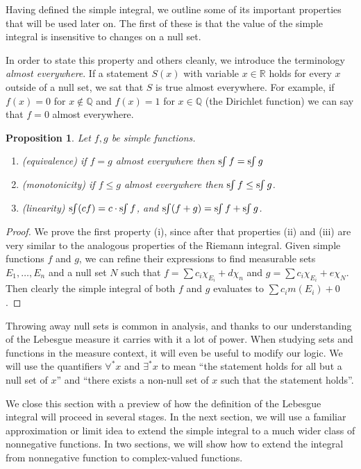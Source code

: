 \documentclass[11pt,oneside]{amsbook}
\newcommand{\QQ}{{\mathbb Q}}
\newcommand{\RR}{{\mathbb R}}
\newcommand{\sint}{\text{s}\kern-3pt\int}
\theoremstyle{definition}
\theoremstyle{plain}
\newtheorem{prop}[thm]{Proposition}
\theoremstyle{definition}
\theoremstyle{remark}
\numberwithin{equation}{section}
\numberwithin{figure}{section}
\begin{document}
Having defined the simple integral, we outline some of its important properties that will be used later on. The first of these is that the value of the simple integral is insensitive to changes on a null set.

In order to state this property and others cleanly, we introduce the terminology \emph{almost everywhere}. If a statement $S(x)$ with variable $x\in\RR$ holds for every $x$ outside of a null set, we sat that $S$ is true almost everywhere. For example, if $f(x)=0$ for $x\notin\QQ$ and $f(x)=1$ for $x\in\QQ$ (the Dirichlet function) we can say that $f=0$ almost everywhere.

\begin{prop}
  Let $f,g$ be simple functions.
  \begin{enumerate}
  \item (equivalence) if $f=g$ almost everywhere then $\sint f=\sint g$
  \item (monotonicity) if $f\leq g$ almost everywhere then $\sint f\leq\sint g$.
  \item (linearity) $\sint (cf)=c\cdot\sint f$, and $\sint (f+g)=\sint f+\sint g$.
  \end{enumerate}
\end{prop}

\begin{proof}
  We prove the first property (i), since after that properties (ii) and (iii) are very similar to the analogous properties of the Riemann integral. Given simple functions $f$ and $g$, we can refine their expressions to find measurable sets $E_1,\ldots,E_n$ and a null set $N$ such that $f=\sum c_i\chi_{E_i}+d\chi_n$ and $g=\sum c_i\chi_{E_i}+e\chi_N$. Then clearly the simple integral of both $f$ and $g$ evaluates to $\sum c_im(E_i)+0$.
\end{proof}

Throwing away null sets is common in analysis, and thanks to our understanding of the Lebesgue measure it carries with it a lot of power. When studying sets and functions in the measure context, it will even be useful to modify our logic. We will use the quantifiers $\forall^*x$ and $\exists^*x$ to mean ``the statement holds for all but a null set of $x$'' and ``there exists a non-null set of $x$ such that the statement holds''.

We close this section with a preview of how the definition of the Lebesgue integral will proceed in several stages. In the next section, we will use a familiar approximation or limit idea to extend the simple integral to a much wider class of nonnegative functions. In two sections, we will show how to extend the integral from nonnegative function to complex-valued functions.
\end{document}
